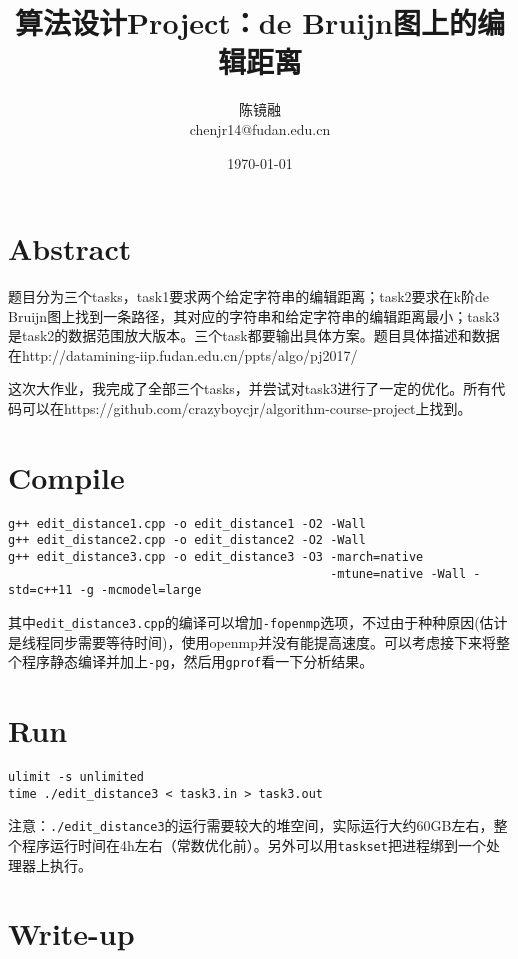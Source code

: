 \documentclass[a4paper, 11pt, nofonts, nocap, fancyhdr]{ctexart}
\title{算法设计Project：de Bruijn图上的编辑距离}
\author{陈镜融 \\ chenjr14@fudan.edu.cn}
\date{\today}
\begin{document}
\maketitle

\section{Abstract}

题目分为三个tasks，task1要求两个给定字符串的编辑距离；task2要求在k阶de Bruijn图上找到一条路径，其对应的字符串和给定字符串的编辑距离最小；task3是task2的数据范围放大版本。三个task都要输出具体方案。题目具体描述和数据在http://datamining-iip.fudan.edu.cn/ppts/algo/pj2017/

这次大作业，我完成了全部三个tasks，并尝试对task3进行了一定的优化。所有代码可以在https://github.com/crazyboycjr/algorithm-course-project上找到。

\section{Compile}

\begin{lstlisting}
g++ edit_distance1.cpp -o edit_distance1 -O2 -Wall
g++ edit_distance2.cpp -o edit_distance2 -O2 -Wall
g++ edit_distance3.cpp -o edit_distance3 -O3 -march=native
                                             -mtune=native -Wall -std=c++11 -g -mcmodel=large
\end{lstlisting}

其中\texttt{edit\_distance3.cpp}的编译可以增加\texttt{-fopenmp}选项，不过由于种种原因(估计是线程同步需要等待时间)，使用openmp并没有能提高速度。可以考虑接下来将整个程序静态编译并加上\texttt{-pg}，然后用\texttt{gprof}看一下分析结果。

\section{Run}

\begin{lstlisting}
ulimit -s unlimited
time ./edit_distance3 < task3.in > task3.out
\end{lstlisting}

注意：\texttt{./edit\_distance3}的运行需要较大的堆空间，实际运行大约60GB左右，整个程序运行时间在4h左右（常数优化前）。另外可以用\texttt{taskset}把进程绑到一个处理器上执行。

\section{Write-up}
\end{document}
